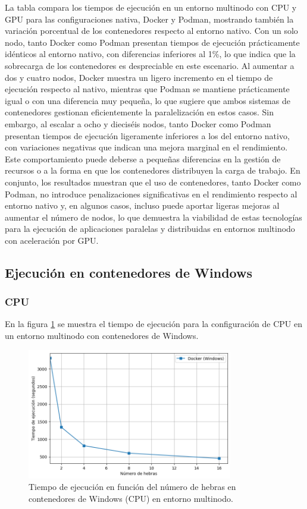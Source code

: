 La tabla compara los tiempos de ejecución en un entorno multinodo con CPU y GPU para las configuraciones nativa, Docker y Podman, mostrando también la variación porcentual de los contenedores respecto al entorno nativo. Con un solo nodo, tanto Docker como Podman presentan tiempos de ejecución prácticamente idénticos al entorno nativo, con diferencias inferiores al 1\%, lo que indica que la sobrecarga de los contenedores es despreciable en este escenario. Al aumentar a dos y cuatro nodos, Docker muestra un ligero incremento en el tiempo de ejecución respecto al nativo, mientras que Podman se mantiene prácticamente igual o con una diferencia muy pequeña, lo que sugiere que ambos sistemas de contenedores gestionan eficientemente la paralelización en estos casos. Sin embargo, al escalar a ocho y dieciséis nodos, tanto Docker como Podman presentan tiempos de ejecución ligeramente inferiores a los del entorno nativo, con variaciones negativas que indican una mejora marginal en el rendimiento. Este comportamiento puede deberse a pequeñas diferencias en la gestión de recursos o a la forma en que los contenedores distribuyen la carga de trabajo. En conjunto, los resultados muestran que el uso de contenedores, tanto Docker como Podman, no introduce penalizaciones significativas en el rendimiento respecto al entorno nativo y, en algunos casos, incluso puede aportar ligeras mejoras al aumentar el número de nodos, lo que demuestra la viabilidad de estas tecnologías para la ejecución de aplicaciones paralelas y distribuidas en entornos multinodo con aceleración por GPU.

\subsection{Ejecución en contenedores de Windows}
\subsubsection{CPU}

En la figura \ref{fig:multi-node_windows_docker_time} se muestra el tiempo de ejecución para la configuración de CPU en un entorno multinodo con contenedores de Windows.

\begin{figure}[H]
    \centering
    \includegraphics[width=0.8\textwidth]{imagenes/cap5/multi-node_windows_docker_time.png}
    \caption{Tiempo de ejecución en función del número de hebras en contenedores de Windows (CPU) en entorno multinodo.}
    \label{fig:multi-node_windows_docker_time}
\end{figure}


